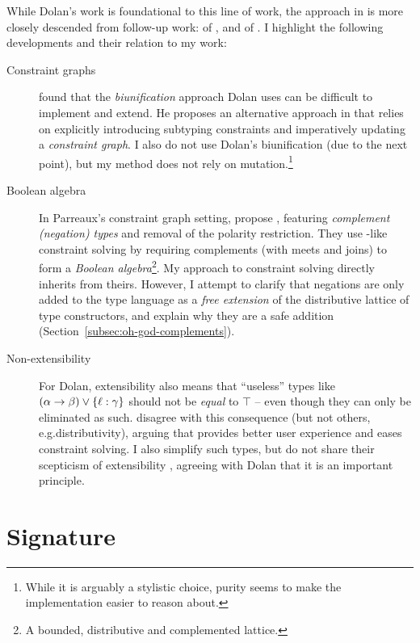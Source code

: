 While Dolan's work is foundational to this line of work, the approach in \inference{} is more closely descended from follow-up work: \simplesub{} of \textcite{simple-sub}, and \mlstruct{} of \textcite{mlstruct}. I highlight the following developments and their relation to my work: \begin{description}
    \item[Constraint graphs] \textcite{simple-sub} found that the \emph{biunification} approach Dolan uses can be difficult to implement and extend. He proposes an alternative approach in \simplesub{} that relies on explicitly introducing subtyping constraints and imperatively updating a \emph{constraint graph}. I also do not use Dolan's biunification (due to the next point), but my method does not rely on mutation.\footnote{While it is arguably a stylistic choice, purity seems to make the implementation easier to reason about.}
    \item[Boolean algebra] In Parreaux's constraint graph setting, \textcite{mlstruct} propose \mlstruct{}, featuring \emph{complement (negation) types} and removal of the polarity restriction. They use \simplesub{}-like constraint solving by requiring complements (with meets and joins) to form a \emph{Boolean algebra}\footnote{A bounded, distributive and complemented lattice.}. My approach to constraint solving directly inherits from theirs. However, I attempt to clarify that negations are only added to the type language as a \emph{free extension} of the distributive lattice of type constructors, and explain why they are a safe addition (Section~\ref{subsec:oh-god-complements}).
    \item[Non-extensibility] For Dolan, extensibility also means that \enquote{useless} types like $(\alpha \to \beta) \join \flrec{\ell : \gamma}$ should not be \emph{equal} to $\top$ \cite[Section~1.4.1]{dolan-thesis} -- even though they can only be eliminated as such. \textcite{mlstruct} disagree with this consequence (but not others, e.g.\@ distributivity), arguing that provides better user experience and eases constraint solving. I also simplify such types, but do not share their scepticism of extensibility \cite{simple-sub}, agreeing with Dolan that it is an important principle. 
\end{description}

\section{Signature}
\label{sec:signature}


